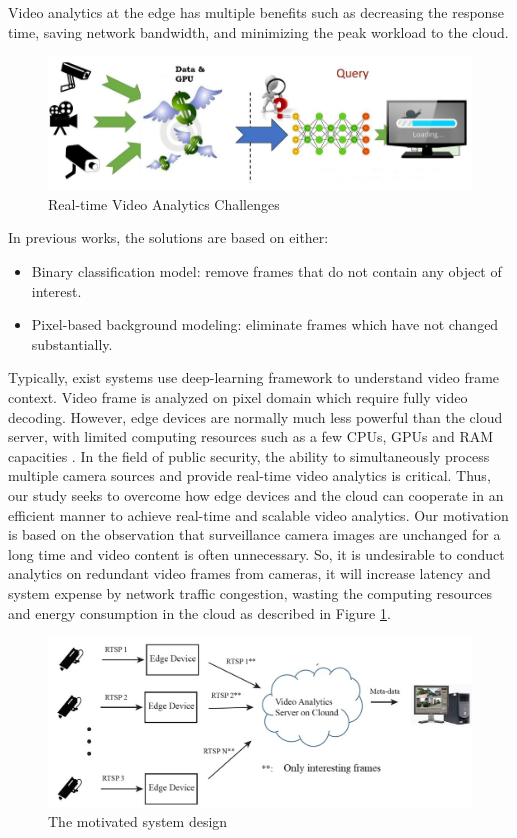 Video analytics at the edge has multiple benefits such as decreasing the response time, saving network bandwidth, and minimizing the peak workload to the cloud. 
\begin{figure}
\centering
 \includegraphics[width=1.0\linewidth]{Figures/vachallenge.png}
 \caption{Real-time Video Analytics Challenges}
 \label{fig:chal}
\end{figure}
In previous works, the solutions are based on either:
\begin{itemize}
\item Binary classification model\cite{canel2019scaling}\cite{kang2017noscope}: remove frames that do not contain any object of interest.
\item Pixel-based background modeling\cite{chen2015glimpse}: eliminate frames which have not changed substantially.
\end{itemize}
Typically, exist systems use deep-learning framework to understand video frame context. Video frame is analyzed on pixel domain which require fully video decoding. However, edge devices are normally much less powerful than the cloud server, with limited computing resources such as a few CPUs, GPUs and RAM capacities \cite{stone2019towards}. In the field of public security, the ability to simultaneously process multiple camera sources and provide real-time video analytics is critical. Thus, our study seeks to overcome how edge devices and the cloud can cooperate in an efficient manner to achieve real-time and scalable video analytics. Our motivation is based on the observation that surveillance camera images are unchanged for a long time and video content is often unnecessary. So, it is undesirable to conduct analytics on redundant video frames from cameras, it will increase latency and system expense by network traffic congestion, wasting the computing resources and energy consumption in the cloud as described in Figure \ref{fig:chal}. \\
\begin{figure}
\centering
 \includegraphics[width=1.0\linewidth]{Figures/motivation.jpg}
 \caption{The motivated system design}
 \label{fig:mot}
\end{figure}
